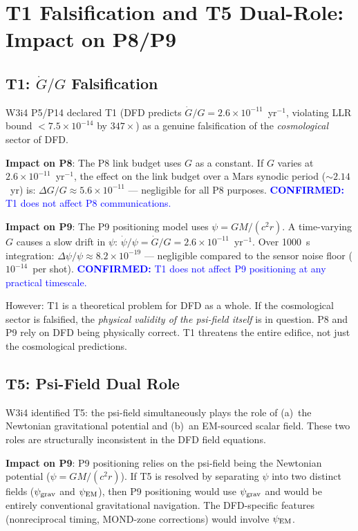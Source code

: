 \documentclass[aps,prd,twocolumn,superscriptaddress,nofootinbib]{revtex4-2}
\newcommand{\confirmed}[1]{\textcolor{blue}{\textbf{CONFIRMED:} #1}}
\begin{document}
\section{T1 Falsification and T5 Dual-Role: Impact on P8/P9}
\label{sec:tensions}

\subsection{T1: $\dot{G}/G$ Falsification}

W3i4 P5/P14 declared T1 (DFD predicts $\dot{G}/G = 2.6\times10^{-11}$~yr$^{-1}$,
violating LLR bound $< 7.5\times10^{-14}$ by $347\times$) as a genuine
falsification of the \emph{cosmological} sector of DFD.

\textbf{Impact on P8}: The P8 link budget uses $G$ as a constant.
If $G$ varies at $2.6\times10^{-11}$~yr$^{-1}$, the effect on the
link budget over a Mars synodic period ($\sim 2.14$~yr) is:
$\Delta G/G \approx 5.6\times10^{-11}$ --- negligible for all P8 purposes.
\confirmed{T1 does not affect P8 communications.}

\textbf{Impact on P9}: The P9 positioning model uses $\psi = GM/(c^2 r)$.
A time-varying $G$ causes a slow drift in $\psi$:
$\dot{\psi}/\psi = \dot{G}/G = 2.6\times10^{-11}$~yr$^{-1}$.
Over 1000~s integration: $\Delta\psi/\psi \approx 8.2\times10^{-19}$
--- negligible compared to the sensor noise floor ($10^{-14}$~per shot).
\confirmed{T1 does not affect P9 positioning at any practical timescale.}

However: T1 is a theoretical problem for DFD as a whole. If the
cosmological sector is falsified, the \emph{physical validity of the
psi-field itself} is in question. P8 and P9 rely on DFD being physically
correct. T1 threatens the entire edifice, not just the cosmological
predictions.

\subsection{T5: Psi-Field Dual Role}

W3i4 identified T5: the psi-field simultaneously plays the role of
(a)~the Newtonian gravitational potential and (b)~an EM-sourced scalar
field. These two roles are structurally inconsistent in the DFD field
equations.

\textbf{Impact on P9}: P9 positioning relies on the psi-field being
the Newtonian potential ($\psi = GM/(c^2 r)$). If T5 is resolved by
separating $\psi$ into two distinct fields ($\psi_{\rm grav}$ and
$\psi_{\rm EM}$), then P9 positioning would use $\psi_{\rm grav}$ and
would be entirely conventional gravitational navigation. The DFD-specific
features (nonreciprocal timing, MOND-zone corrections) would involve
$\psi_{\rm EM}$.
\end{document}
